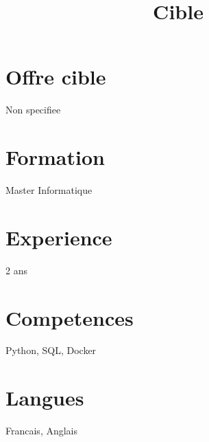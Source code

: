 \documentclass[11pt,a4paper]{moderncv}
\title{Cible}
\begin{document}
\makecvtitle

\section{Offre cible}
Non specifiee

\section{Formation}
Master Informatique

\section{Experience}
2 ans

\section{Competences}
Python, SQL, Docker

\section{Langues}
Francais, Anglais
\end{document}
